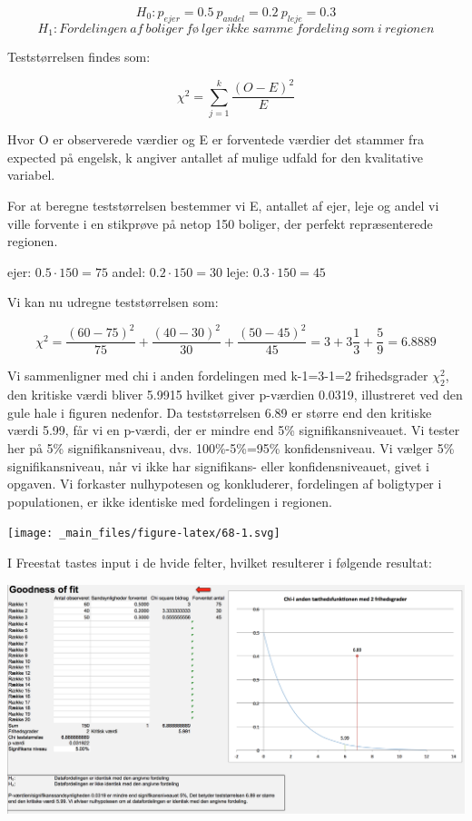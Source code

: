 \documentclass[]{book}
\begin{document}
\[H_0:p_{ejer}=0.5\ p_{andel}=0.2\ p_{leje}=0.3\]\[H_1:Fordelingen\ af\ boliger\ fø\ lger\ ikke\ samme\ fordeling\ som\ i\ regionen\]

Teststørrelsen findes som:

\[\chi^2=\sum^k_{j=1}\frac{(O-E)^2}{E}\]

Hvor O er observerede værdier og E er forventede værdier det stammer fra expected på engelsk, k angiver antallet af mulige udfald for den kvalitative variabel.

For at beregne teststørrelsen bestemmer vi E, antallet af ejer, leje og andel vi ville forvente i en stikprøve på netop 150 boliger, der perfekt repræsenterede regionen.

ejer: \(0.5\cdot150=75\)
andel: \(0.2\cdot150=30\)
leje: \(0.3\cdot150=45\)

Vi kan nu udregne teststørrelsen som:

\[\chi^2=\frac{(60-75)^2}{75}+\frac{(40-30)^2}{30}+\frac{(50-45)^2}{45}=3+3\frac{1}{3}+\frac{5}{9}=6.8889\]

Vi sammenligner med chi i anden fordelingen med k-1=3-1=2 frihedsgrader \(\chi^2_2\), den kritiske værdi bliver 5.9915 hvilket giver p-værdien 0.0319, illustreret ved den gule hale i figuren nedenfor. Da teststørrelsen 6.89 er større end den kritiske værdi 5.99, får vi en p-værdi, der er mindre end 5\% signifikansniveauet. Vi tester her på 5\% signifikansniveau, dvs. 100\%-5\%=95\% konfidensniveau. Vi vælger 5\% signifikansniveau, når vi ikke har signifikans- eller konfidensniveauet, givet i opgaven. Vi forkaster nulhypotesen og konkluderer, fordelingen af boligtyper i populationen, er ikke identiske med fordelingen i regionen.

\texttt{[image: \_main\_files/figure-latex/68-1.svg]}

I Freestat tastes input i de hvide felter, hvilket resulterer i følgende resultat:

\includegraphics{img/gofbolig.png}
\end{document}
